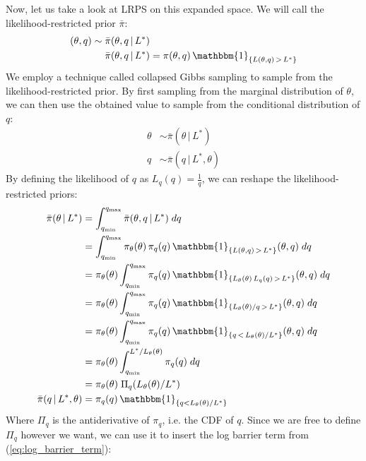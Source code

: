 \documentclass[12pt, a4paper]{report}
\begin{document}
Now, let us take a look at LRPS on this expanded space.
We will call the likelihood-restricted prior $\bar{\pi}$:
\begin{align*}
    (\theta,q) \sim \; &\bar{\pi}(\theta, q \,|\, L^*) \\
    &\bar{\pi}(\theta, q \,|\, L^*) = \pi(\theta, q) \, \mathbbm{1}_{\{L(\theta, q) \, > \, L^*\}}
\end{align*}
We employ a technique called collapsed Gibbs sampling \cite{collapsed_gibbs} to sample from the likelihood-restricted prior.
By first sampling from the marginal distribution of $\theta$, we can then use the obtained value to sample from the conditional distribution of $q$:
\begin{align*}
    \theta &\sim  \bar{\pi}(\theta \,|\, L^*) \\
    q &\sim  \bar{\pi}(q \,|\, L^*, \theta)
\end{align*}
By defining the likelihood of $q$ as $L_q(q) = \frac{1}{q}$, we can reshape the likelihood-restricted priors:
\begin{align*}
    \bar{\pi}(\theta \,|\, L^*) &= \int_{q_{\textrm{min}}}^{q_{\textrm{max}}} \bar{\pi}(\theta, q \,|\, L^*) \; dq \\
    &= \int_{q_{\textrm{min}}}^{q_{\textrm{max}}} \pi_\theta(\theta) \, \pi_q(q) \, \mathbbm{1}_{\{L(\theta, q) \,>\, L^*\}}(\theta, q) \; dq \\
    &= \pi_\theta(\theta) \int_{q_{\textrm{min}}}^{q_{\textrm{max}}} \pi_q(q) \, \mathbbm{1}_{\{L_\theta(\theta) \, L_q(q) \,>\, L^*\}}(\theta, q) \; dq \\
    &= \pi_\theta(\theta) \int_{q_{\textrm{min}}}^{q_{\textrm{max}}} \pi_q(q) \, \mathbbm{1}_{\{L_\theta(\theta) / q \,>\, L^*\}}(\theta, q) \; dq \\
    &= \pi_\theta(\theta) \int_{q_{\textrm{min}}}^{q_{\textrm{max}}} \pi_q(q) \, \mathbbm{1}_{\{q \,<\, L_\theta(\theta) / L^*\}}(\theta, q) \; dq \\
    &= \pi_\theta(\theta) \int_{q_{\textrm{min}}}^{L^* / L_\theta(\theta)} \pi_q(q) \; dq \\
    &= \pi_\theta(\theta) \; \Pi_q(L_\theta(\theta) / L^*) \\
    \bar{\pi}(q \,|\, L^*, \theta) &= \pi_q(q) \, \mathbbm{1}_{\{q < L_\theta(\theta) / L^*\}}
\end{align*}
Where $\Pi_q$ is the antiderivative of $\pi_q$, i.e. the CDF of $q$.
Since we are free to define $\Pi_q$ however we want, we can use it to insert the log barrier term from (\ref{eq:log_barrier_term}):
\end{document}
